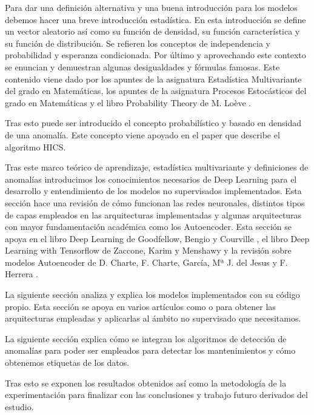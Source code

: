 Para dar una definición alternativa y una buena introducción para los modelos debemos hacer una breve introducción estadística. En esta introducción se define un vector aleatorio así como su función de densidad, su función característica y su función de distribución. Se refieren los conceptos de independencia y probabilidad y esperanza condicionada. Por último y aprovechando este contexto se enuncian y demuestran algunas desigualdades y fórmulas famosas. Este contenido viene dado por los apuntes de la asignatura Estadística Multivariante del grado en Matemáticas, los apuntes de la asignatura Procesos Estocásticos del grado en Matemáticas y el libro Probability Theory de M. Loève \cite{m._loeve_probability_1977}.

Tras esto puede ser introducido el concepto probabilístico y basado en densidad de una anomalía. Este concepto viene apoyado en el paper \cite{fabian_keller_hics:_2012} que describe el algoritmo HICS.

Tras este marco teórico de aprendizaje, estadística multivariante y definiciones de anomalías introducimos los conocimientos necesarios de Deep Learning para el desarrollo y entendimiento de los modelos no supervisados implementados. Esta sección hace una revisión de cómo funcionan las redes neuronales, distintos tipos de capas empleados en las arquitecturas implementadas y algunas arquitecturas con mayor fundamentación académica como los Autoencoder. Esta sección se apoya en el libro Deep Learning de Goodfellow, Bengio y Courville \cite{goodfellow_deep_2016}, el libro Deep Learning with Tensorflow de Zaccone, Karim y Menshawy \cite{giancarlo_deep_2017} y la revisión sobre modelos Autoencoder de D. Charte, F. Charte, García, Mª J. del Jesus y F. Herrera \cite{david_practical_2018}.

La siguiente sección analiza y explica los modelos implementados con su código propio. Esta sección se apoya en varios artículos como \cite{lih_oh_automated_2018} o \cite{david_practical_2018} para obtener las arquitecturas empleadas y aplicarlas al ámbito no supervisado que necesitamos.

La siguiente sección explica cómo se integran los algoritmos de detección de anomalías para poder ser empleados para detectar los mantenimientos y cómo obtenemos etiquetas de los datos.

Tras esto se exponen los resultados obtenidos así como la metodología de la experimentación para finalizar con las conclusiones y trabajo futuro derivados del estudio.

